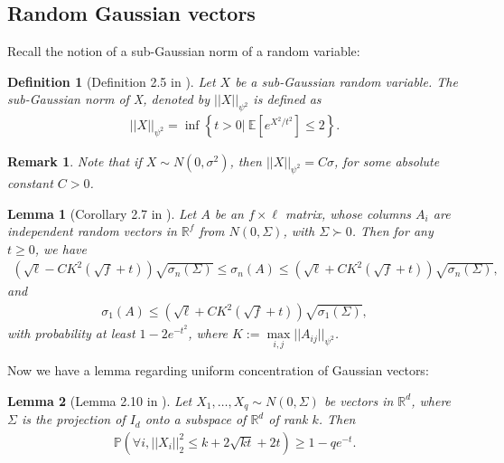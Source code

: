 \documentclass{article}
\newtheorem{remark}{Remark}
\newtheorem{definition}{Definition}
\newtheorem{lemma}{Lemma}
\begin{document}
\subsection{Random Gaussian vectors}

Recall the notion of a sub-Gaussian norm of a random variable:
\begin{definition}[Definition 2.5 in \cite{SinSte21}]
Let $X$ be a sub-Gaussian random variable. The sub-Gaussian norm of X, denoted by $||X||_{\psi^2}$ is defined as
\begin{align*}
||X||_{\psi^2} = \inf\left\{t > 0| \ \mathbb{E}\left[e^{X^2/t^2}\right] \leq 2\right\}.
\end{align*}
\end{definition}
\begin{remark}
Note that if $X \sim N(0, \sigma^2)$, then $||X||_{\psi^2} = C\sigma$, for some absolute constant $C > 0$.
\end{remark}

\begin{lemma}[Corollary 2.7 in \cite{SinSte21}]
\label{lemma:cor2.7SinSte}
Let $A$ be an $f \times \ell$ matrix, whose columns $A_i$ are independent random vectors in $\mathbb{R}^f$ from $N(0, \Sigma)$, with $\Sigma \succ 0$. Then for any $t \geq 0$, we have
\begin{align*}
(\sqrt{\ell} - CK^2(\sqrt{f} + t))\sqrt{\sigma_n(\Sigma)} \leq \sigma_n(A) \leq (\sqrt{\ell} + CK^2(\sqrt{f} + t))\sqrt{\sigma_n(\Sigma)},
\end{align*}
and
\begin{align*}
\sigma_1(A) \leq (\sqrt{\ell} + CK^2(\sqrt{f} + t))\sqrt{\sigma_1(\Sigma)},
\end{align*}
with probability at least $1 - 2e^{-t^2}$, where $K := \max\limits_{i, j}||A_{ij}||_{\psi^2}$.
\end{lemma}

Now we have a lemma regarding uniform concentration of Gaussian vectors:
\begin{lemma}[Lemma 2.10 in \cite{SinSte21}]
\label{lemma:lem2.10SinSte}
Let $X_1, \dots, X_q \sim N(0, \Sigma)$ be vectors in $\mathbb{R}^d$, where $\Sigma$ is the projection of $I_d$ onto a subspace of $\mathbb{R}^d$ of rank $k$. Then 
\begin{align*}
\mathbb{P}\left(\forall i, ||X_i||_2^2 \leq k + 2\sqrt{kt} + 2t\right) \geq 1 - qe^{-t}.
\end{align*}  
\end{lemma}

\end{document}
